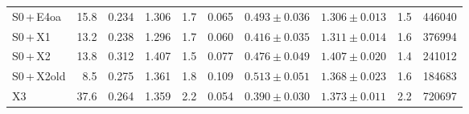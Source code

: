 \begin{tabular}{@{}l r r r r r r r r r@{}}
S0\,+\,E4oa & 15.8 & 0.234 & 1.306 & 1.7 & 0.065 & $0.493\pm0.036$ & $1.306\pm0.013$ & 1.5 & 446040 \\
S0\,+\,X1 & 13.2 & 0.238 & 1.296 & 1.7 & 0.060 & $0.416\pm0.035$ & $1.311\pm0.014$ & 1.6 & 376994 \\
S0\,+\,X2 & 13.8 & 0.312 & 1.407 & 1.5 & 0.077 & $0.476\pm0.049$ & $1.407\pm0.020$ & 1.4 & 241012 \\
S0\,+\,X2old & 8.5 & 0.275 & 1.361 & 1.8 & 0.109 & $0.513\pm0.051$ & $1.368\pm0.023$ & 1.6 & 184683 \\
X3 & 37.6 & 0.264 & 1.359 & 2.2 & 0.054 & $0.390\pm0.030$ & $1.373\pm0.011$ & 2.2 & 720697 \\
\bottomrule
\end{tabular}
